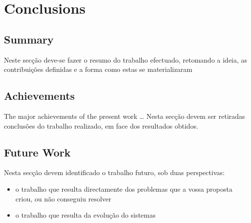 \chapter{Conclusions}
\label{chapter:conclusion}

\section{Summary}
\label{section:summary}
Neste secção deve-se fazer o resumo do trabalho efectuado, retomando a ideia, as
contribuições definidas e a forma como estas se materializaram

\section{Achievements}
\label{section:achievements}
The major achievements of the present work \ldots
Nesta secção devem ser retiradas conclusões do trabalho realizado, em face dos
resultados obtidos.

\section{Future Work}
\label{section:future}
Nesta secção devem identificado o trabalho futuro, sob duas perspectivas:
\begin{itemize}
\item o trabalho que resulta directamente dos problemas que a vossa proposta criou, ou não conseguiu resolver
\item o trabalho que resulta da evolução do sistemas
\end{itemize}


\cleardoublepage

